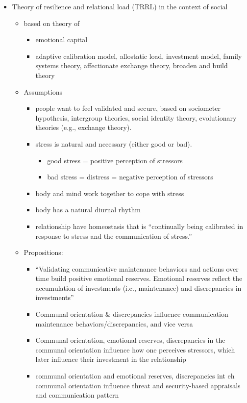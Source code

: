 \documentclass[
]{book}
\begin{document}
\citep{AFIFI_2016}

\begin{itemize}
\item
  Theory of resilience and relational load (TRRL) in the context of social

  \begin{itemize}
  \item
    based on theory of

    \begin{itemize}
    \item
      emotional capital
    \item
      adaptive calibration model, allostatic load, investment model, family systems theory, affectionate exchange theory, broaden and build theory
    \end{itemize}
  \item
    Assumptions

    \begin{itemize}
    \item
      people want to feel validated and secure, based on sociometer hypothesis, intergroup theories, social identity theory, evolutionary theories (e.g., exchange theory).
    \item
      stress is natural and necessary (either good or bad).

      \begin{itemize}
      \item
        good stress = positive perception of stressors
      \item
        bad stress = distress = negative perception of stressors
      \end{itemize}
    \item
      body and mind work together to cope with stress
    \item
      body has a natural diurnal rhythm
    \item
      relationship have homeostasis that is ``continually being calibrated in response to stress and the communication of stress.''
    \end{itemize}
  \item
    Propositions:

    \begin{itemize}
    \item
      ``Validating communicative maintenance behaviors and actions over time build positive emotional reserves. Emotional reserves reflect the accumulation of investments (i.e., maintenance) and discrepancies in investments''
    \item
      Communal orientation \& discrepancies influence communication maintenance behaviors/discrepancies, and vice versa
    \item
      Communal orientation, emotional reserves, discrepancies in the communal orientation influence how one perceives stressors, which later influence their investment in the relationship
    \item
      communal orientation and emotional reserves, discrepancies int eh communal orientation influence threat and security-based appraisals and communication pattern


\end{itemize}
\end{itemize}
\end{itemize}
\end{document}
